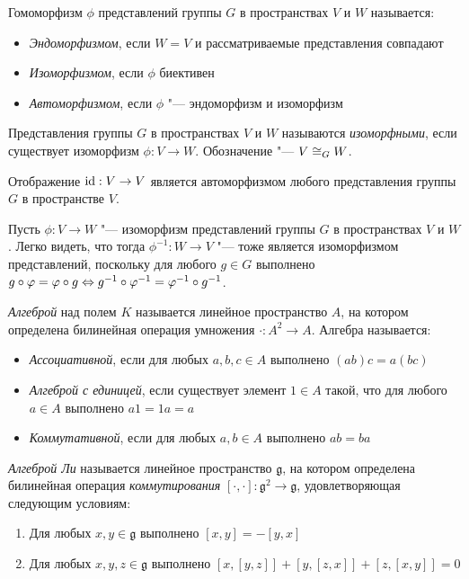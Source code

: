 \begin{definition}
	Гомоморфизм $\phi$ представлений группы $G$ в пространствах $V$ и $W$ называется:
	\begin{itemize}
		\item \textit{Эндоморфизмом}, если $W = V$ и рассматриваемые представления совпадают
		\item \textit{Изоморфизмом}, если $\phi$ биективен
		\item \textit{Автоморфизмом}, если $\phi$ "--- эндоморфизм и изоморфизм
	\end{itemize}
\end{definition}

\begin{definition}
	Представления группы $G$ в пространствах $V$ и $W$ называются \textit{изоморфными}, если существует изоморфизм $\phi: V \to W$. Обозначение "--- $V \cong_G W$.
\end{definition}

\begin{example}
	Отображение $\mathrm{id} : V \to V$ является автоморфизмом любого представления группы $G$ в пространстве $V$.
\end{example}

\begin{note}
	Пусть $\phi : V \to W$ "--- изоморфизм представлений группы $G$ в пространствах $V$ и $W$. Легко видеть, что тогда $\phi^{-1} : W \to V$ "--- тоже является изоморфизмом представлений, поскольку для любого $g \in G$ выполнено $g\circ\varphi = \varphi \circ g \Leftrightarrow g^{-1}\circ\varphi^{-1} = \varphi^{-1}\circ g^{-1}$.
\end{note}

\begin{definition}
	\textit{Алгеброй} над полем $K$ называется линейное пространство $A$, на котором определена билинейная операция умножения $\cdot : A^2 \to A$. Алгебра называется:
	\begin{itemize}
		\item \textit{Ассоциативной}, если для любых $a, b, c \in A$ выполнено $(ab)c = a(bc)$
		\item \textit{Алгеброй с единицей}, если существует элемент $1 \in A$ такой, что для любого $a \in A$ выполнено $a1 = 1a = a$
		\item \textit{Коммутативной}, если для любых $a, b \in A$ выполнено $ab = ba$
	\end{itemize}
\end{definition}

\begin{definition}
	\textit{Алгеброй Ли} называется линейное пространство $\mathfrak g$, на котором определена билинейная операция \textit{коммутирования} $[\cdot,\cdot] : \mathfrak g^2 \to \mathfrak g$, удовлетворяющая следующим условиям:
	\begin{enumerate}
		\item Для любых $x, y \in \mathfrak g$ выполнено $[x, y] = -[y, x]$
		\item Для любых $x, y, z \in \mathfrak g$ выполнено $[x, [y, z]] + [y, [z, x]] + [z, [x, y]] = 0$
	\end{enumerate}
\end{definition}

